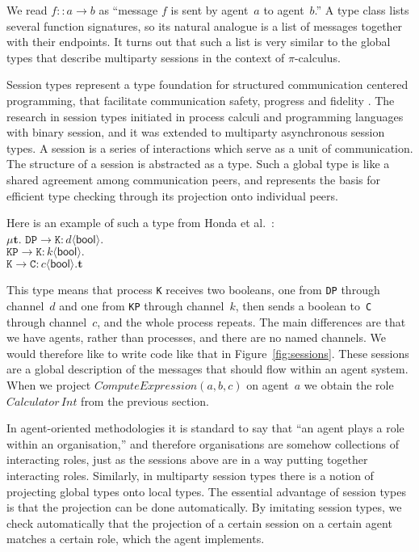 \documentclass[a4paper,12pt,oneside,fleqn]{book} %
\begin{document}
{\def\l#1->#2:#3<#4>{\mathtt{#1}\to\mathtt{#2}:#3\langle\mathsf{#4}\rangle}
We read $f::a\to b$ as ``message $f$ is sent by agent~$a$ to agent~$b$.'' A
type class lists several function signatures, so its natural analogue is a
list of messages together with their endpoints. It turns out that such a
list is very similar to the global types that describe multiparty sessions
in the context of $\pi$-calculus.

Session types represent a type foundation for structured communication
centered programming, that facilitate communication safety, progress and
fidelity \cite{dblp:conf/popl/hondayc08}. The research in session types
initiated in process calculi and programming languages with binary session,
and it was extended to multiparty asynchronous session types. A session is
a series of interactions which serve as a unit of communication. The
structure of a session is abstracted as a type. Such a global type is like
a shared agreement among communication peers, and represents the basis for
efficient type checking through its projection onto individual peers.

 

Here is an example of such a type from 
Honda et al.~\cite{dblp:conf/popl/hondayc08}:\\
$\mu\mathbf{t}.$
  $\l DP->K:d<bool>. $\\
  $\l KP->K:k<bool>. $\\
  $\l K->C:c<bool>.\mathbf{t}$

This type means that process \texttt{K} receives two booleans, one from
\texttt{DP} through channel~$d$ and one from \texttt{KP} through channel~$k$,
then sends a boolean to~\texttt{C} through channel~$c$, and the whole process
repeats. The main differences are that we have agents, rather than processes,
and there are no named channels. We would therefore like to write code like
that in Figure~\ref{fig:sessions}.  These sessions are a global description of
the messages that should flow within an agent system. When we project
$\mathit{ComputeExpression}(a,b,c)$ on agent~$a$ we obtain the role
$\mathit{Calculator}\,\mathit{Int}$ from the previous section.}

In agent-oriented methodologies it is standard to say that ``an agent plays
a role within an organisation,'' and therefore organisations are somehow
collections of interacting roles, just as the sessions above are in a way
putting together interacting roles. Similarly, in multiparty session types
there is a notion of projecting global types onto local types. The
essential advantage of session types is that the projection can be done
automatically. By imitating session types, we check automatically that the
projection of a certain session on a certain agent matches a certain role,
which the agent implements.
\end{document}
